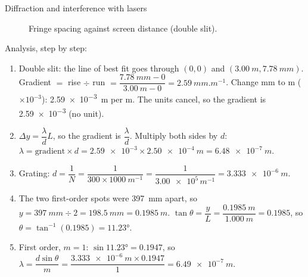 \begin{experiment}{Diffraction and interference with lasers}
{\begin{figure}
    \caption{Fringe spacing against screen distance (double slit).}
    \label{ch2:fig:dygraph}
  \end{figure}
  Analysis, step by step:\par\nopagebreak
  \begin{enumerate}[beginpenalty=10000]
    \item Double slit: the line of best fit goes through $(0, 0)$ and
          $(\qty{3.00}{m}, \qty{7.78}{mm})$. Gradient $=$ rise $\div$ run
          $= \dfrac{\qty{7.78}{mm} - 0}{\qty{3.00}{m} - 0} = \qty{2.59}{mm.m^{-1}}$.
          Change mm to m ($\times 10^{-3}$): \qty{2.59e-3}{m} per m. The units cancel, so
          the gradient is \num{2.59e-3} (no unit).
    \item $\Delta y = \dfrac{\lambda}{d}L$, so the gradient is $\dfrac{\lambda}{d}$.
          Multiply both sides by $d$: $\lambda = \text{gradient} \times d =
          \num{2.59e-3} \times \qty{2.50e-4}{m} = \qty{6.48e-7}{m}$.
    \item Grating: $d = \dfrac{1}{N} = \dfrac{1}{300 \times \qty{1000}{m^{-1}}}
          = \dfrac{1}{\num{3.00e5}\,\unit{m^{-1}}} = \qty{3.333e-6}{m}$.
    \item The two first-order spots were \qty{397}{mm} apart, so
          $y = \qty{397}{mm} \div 2 = \qty{198.5}{mm} = \qty{0.1985}{m}$.
          $\tan\theta = \dfrac{y}{L} = \dfrac{\qty{0.1985}{m}}{\qty{1.000}{m}} = 0.1985$,
          so $\theta = \tan^{-1}(0.1985) = \ang{11.23}$.
    \item First order, $m = 1$: $\sin\ang{11.23} = 0.1947$, so
          $\lambda = \dfrac{d\sin\theta}{m} = \dfrac{\qty{3.333e-6}{m} \times 0.1947}{1}
          = \qty{6.49e-7}{m}$.
  \end{enumerate}}
\end{experiment}

